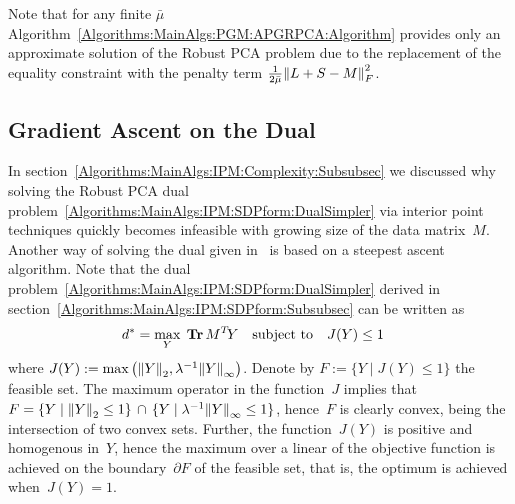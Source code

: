 \documentclass{../../common/projectreport}
\begin{document}
\begin{remark}
Note that for any finite $\bar{\mu}$ Algorithm~\ref{Algorithms:MainAlgs:PGM:APGRPCA:Algorithm} provides only an approximate solution of the Robust PCA problem due to the replacement of the equality constraint with the penalty term $\frac{1}{2\bar{\mu}} {\left\|L+S-M\right\|}_{F}^{2}$.
\end{remark}


\subsection{Gradient Ascent on the Dual}
\label{Algorithms:MainAlgs:GAD:Subsec}

In section~\ref{Algorithms:MainAlgs:IPM:Complexity:Subsubsec} we discussed why solving the Robust PCA dual problem~\eqref{Algorithms:MainAlgs:IPM:SDPform:DualSimpler} via interior point techniques quickly becomes infeasible with growing size of the data matrix~$M$. Another way of solving the dual given in~\cite{Lin:2009kx} is based on a steepest ascent algorithm. Note that the dual problem~\eqref{Algorithms:MainAlgs:IPM:SDPform:DualSimpler} derived in section~\ref{Algorithms:MainAlgs:IPM:SDPform:Subsubsec} can be written as 
%
\begin{align}
d^* = \max_{Y} \; &\operatorname{\mathbf{Tr}} M^T\!Y \quad \text{subject to}\quad J(Y) \leq 1
\label{Algorithms:MainAlgs:GAD:Dual}
\end{align}
%
where $J(Y) := \max\left({\left\|Y\right\|}_{2}^{}, \lambda^{-1}{\left\|Y\right\|}_{\infty}^{}\right)$. Denote by $F := \{Y \mid J(Y)\leq1 \}$ the feasible set. The maximum operator in the function~$J$ implies that~$F=\{Y \mid {\left\|Y\right\|}_{2}^{}\leq1\}\, \cap\, \{Y \mid \lambda^{-1}{\left\|Y\right\|}_{\infty}^{}\leq1\}$, hence~$F$ is clearly convex, being the intersection of two convex sets. Further, the function~$J(Y)$ is positive and homogenous in~$Y$, hence the maximum over a linear of the objective function is achieved on the boundary~$\partial F$ of the feasible set, that is, the optimum is achieved when~$J(Y)=1$. 
\end{document}
